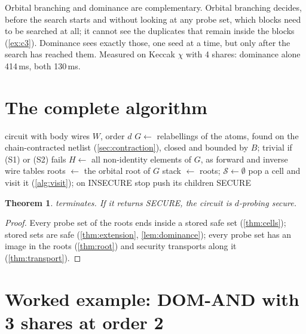 \documentclass[11pt,a4paper]{article}
\newtheorem{theorem}{Theorem}[section]
\theoremstyle{definition}
\theoremstyle{remark}
\newcommand{\code}[1]{\texttt{\small #1}}
\newcommand{\lean}[2]{\code{#1}\,(\code{#2})}
\begin{document}
\begin{intuition}
Orbital branching and dominance are complementary.  Orbital branching decides, before the
search starts and without looking at any probe set, which blocks need to be searched at
all; it cannot see the duplicates that remain inside the blocks (\cref{ex:c3}).  Dominance
sees exactly those, one seed at a time, but only after the search has reached them.
Measured on Keccak $\chi$ with 4 shares: dominance alone 414\,ms, both 130\,ms.
\end{intuition}

\section{The complete algorithm}\label{sec:complete}

\begin{algorithm}[ht]
\caption{Symmetric cell search (\lean{checkDProbingSym}{Symmetry.lean})}\label{alg:full}
\begin{algorithmic}[1]
\Require circuit with body wires $W$, order $d$
\State $G\gets$ relabellings of the atoms, found on the chain-contracted netlist (\cref{sec:contraction}), closed and bounded by $B$; trivial if (S1) or (S2) fails
\State $H\gets$ all non-identity elements of $G$, as forward and inverse wire tables
\State roots $\gets$ the orbital root of $G$
\State stack $\gets$ roots; $\mathcal S\gets\emptyset$
  \State pop a cell and visit it (\cref{alg:visit}); on INSECURE stop
  \State push its children
\EndWhile
\State \Return SECURE
\end{algorithmic}
\end{algorithm}

\begin{theorem}
 terminates.  If it returns SECURE, the circuit is $d$-probing secure.
\end{theorem}
\begin{proof}
Every probe set of the roots ends inside a stored safe set (\cref{thm:cells}); stored sets
are safe (\cref{thm:extension}, \cref{lem:dominance}); every probe set has an image in the
roots (\cref{thm:root}) and security transports along it (\cref{thm:transport}).
\end{proof}

\section{Worked example: DOM-AND with 3 shares at order 2}\label{sec:example}
\end{document}
